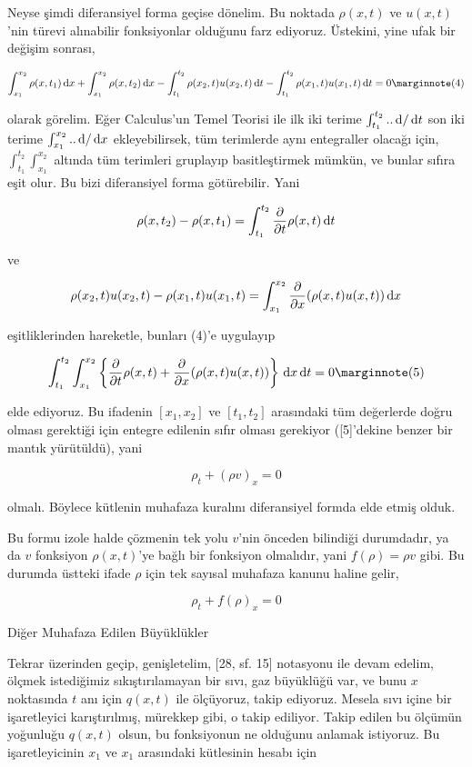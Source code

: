 \documentclass[12pt,fleqn]{article}\usepackage{../../common}
\begin{document}
Neyse şimdi diferansiyel forma geçise dönelim. Bu noktada $\rho(x,t)$ ve
$u(x,t)$'nin türevi alınabilir fonksiyonlar olduğunu farz ediyoruz. Üstekini,
yine ufak bir değişim sonrası,

$$
\int_{x_1}^{x_2} \rho(x,t_1) \ud x  +
\int_{x_1}^{x_2} \rho(x,t_2) \ud x -
\int_{t_1}^{t_2}  \rho(x_2,t) u(x_2,t) \ud t -
\int_{t_1}^{t_2} \rho(x_1,t) u(x_1,t) \ud t = 0
\mlabel{4}
$$

olarak görelim. Eğer Calculus'un Temel Teorisi ile ilk iki terime
$\int_{t_1}^{t_2} .. \,\mathrm{d} / \,\mathrm{d} t$ son iki terime $\int_{x_1}^{x_2} .. \,\mathrm{d} / \,\mathrm{d} x$
ekleyebilirsek, tüm terimlerde aynı entegraller olacağı için, 
$\int_{t_1}^{t_2} \int_{x_1}^{x_2}$ altında tüm terimleri gruplayıp
basitleştirmek mümkün, ve bunlar sıfıra eşit olur. Bu bizi diferansiyel
forma götürebilir. Yani

$$
\rho(x,t_2) - \rho(x,t_1) = \int_{t_1}^{t_2}
\frac{\partial }{\partial t} \rho(x,t) \,\mathrm{d} t
$$

ve

$$
\rho(x_2,t)u(x_2,t) - \rho(x_1,t)u(x_1,t) =
\int_{x_1}^{x_2} \frac{\partial }{\partial x} (\rho(x,t)u(x,t)) \,\mathrm{d} x
$$

eşitliklerinden hareketle, bunları (4)'e uygulayıp

$$
\int_{t_1}^{t_2} \int_{x_1}^{x_2}  \left\{
\frac{\partial }{\partial t} \rho(x,t)  +
\frac{\partial }{\partial x} (\rho(x,t)u(x,t))
\right\} \ud x \ud t = 0
\mlabel{5}
$$

elde ediyoruz. Bu ifadenin $[x_1,x_2]$ ve $[t_1,t_2]$ arasındaki tüm değerlerde
doğru olması gerektiği için entegre edilenin sıfır olması gerekiyor ([5]'dekine
benzer bir mantık yürütüldü), yani

$$
\rho_t + (\rho v)_x = 0
$$

olmalı. Böylece kütlenin muhafaza kuralını diferansiyel formda elde etmiş olduk.

Bu formu izole halde çözmenin tek yolu $v$'nin önceden bilindiği durumdadır, ya
da $v$ fonksiyon $\rho(x,t)$'ye bağlı bir fonksiyon olmalıdır, yani
$f(\rho) = \rho v$ gibi. Bu durumda üstteki ifade $\rho$ için tek sayısal
muhafaza kanunu haline gelir,

$$
\rho_t + f(\rho)_x = 0
$$

Diğer Muhafaza Edilen Büyüklükler

Tekrar üzerinden geçip, genişletelim, [28, sf. 15] notasyonu ile devam edelim,
ölçmek istediğimiz sıkıştırılamayan bir sıvı, gaz büyüklüğü var, ve bunu $x$
noktasında $t$ anı için $q(x,t)$ ile ölçüyoruz, takip ediyoruz. Mesela sıvı
içine bir işaretleyici karıştırılmış, mürekkep gibi, o takip ediliyor. Takip
edilen bu ölçümün yoğunluğu $q(x,t)$ olsun, bu fonksiyonun ne olduğunu anlamak
istiyoruz. Bu işaretleyicinin $x_1$ ve $x_1$ arasındaki kütlesinin hesabı için
\end{document}
